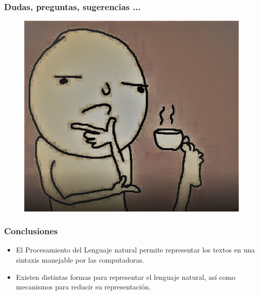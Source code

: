 \documentclass[
10pt, %
aspectratio=169, %
]{beamer}
\begin{document}
	
	\begin{frame}
		
		\frametitle{Dudas, preguntas, sugerencias ...}
		
		\begin{figure}[h]
			\centering
			\includegraphics[scale=0.38]{duda.png}
		\end{figure}
		
	\end{frame}
	
	
	\begin{frame}
		
		\frametitle{Conclusiones}
		
		\begin{itemize}
			
			\item El Procesamiento del Lenguaje natural permite representar los textos en una sintaxis manejable por las computadoras. \\[4mm]
			
			\item Existen distintas formas para representar el lenguaje natural, así como mecanismos para reducir su representación.
			
		\end{itemize}
		
	\end{frame}
	
\end{document}
